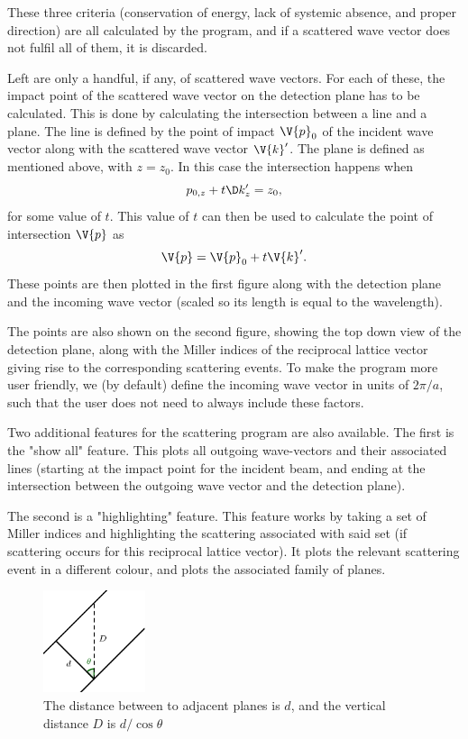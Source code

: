 \documentclass[main.tex]{subfiles}
\begin{document}
	These three criteria (conservation of energy, lack of systemic absence, and proper direction) are all calculated by the program, and if a scattered wave vector does not fulfil all of them, it is discarded.
	
	Left are only a handful, if any, of scattered wave vectors. For each of these, the impact point of the scattered wave vector on the detection plane has to be calculated. This is done by calculating the intersection between a line and a plane. The line is defined by the point of impact $ \V{p}_0 $ of the incident wave vector along with the scattered wave vector $ \V{k}' $. The plane is defined as mentioned above, with $ z=z_0 $. In this case the intersection happens when
	\begin{equation}
		p_{0,z} + t\D k'_z = z_0,
	\end{equation}
	for some value of $ t $. This value of $ t $ can then be used to calculate the point of intersection $ \V{p} $ as
	\begin{equation}
		\V{p} = \V{p}_0 + t \V{k}'.
	\end{equation}
	These points are then plotted in the first figure along with the detection plane and the incoming wave vector (scaled so its length is equal to the wavelength).
	
	The points are also shown on the second figure, showing the top down view of the detection plane, along with the Miller indices of the reciprocal lattice vector giving rise to the corresponding scattering events. To make the program more user friendly, we (by default) define the incoming wave vector in units of $ 2\pi/a $, such that the user does not need to always include these factors.
	
	Two additional features for the scattering program are also available. The first is the "show all" feature. This plots all outgoing wave-vectors and their associated lines (starting at the impact point for the incident beam, and ending at the intersection between the outgoing wave vector and the detection plane).
	
	The second is a "highlighting" feature. This feature works by taking a set of Miller indices and highlighting the scattering associated with said set (if scattering occurs for this reciprocal lattice vector). It plots the relevant scattering event in a different colour, and plots the associated family of planes.
	
	\begin{figure}
		\includegraphics[width=3cm]{figures/plane_distance.pdf}
		\caption{The distance between to adjacent planes is $ d $, and the vertical distance $ D $ is $ d/\cos \theta$}
		\label{fig:plane_distance}
	\end{figure}
	
\end{document}
